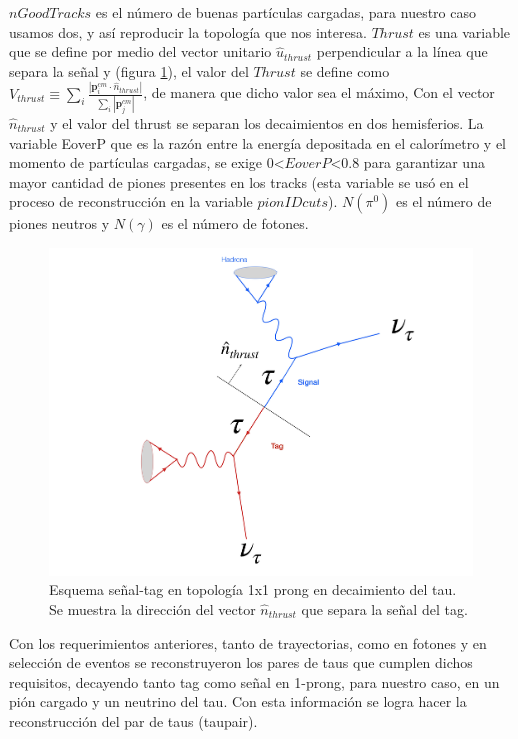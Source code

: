 \(nGoodTracks\) es el número de buenas partículas cargadas, para nuestro caso usamos dos, y así reproducir la topología que nos interesa. \(Thrust\) es una variable que se define por medio del vector unitario \(\hat{u}_{thrust}\) perpendicular a la línea que separa la señal y  (figura \ref{fig:MminTopo}), el valor del \(Thrust\) se define como \(V_{thrust}\equiv\sum_{i}\frac{|\mathbf{p}_i^{cm} \cdot \hat{n}_{thrust}|}{\sum_{i}|\mathbf{p}_{j}^{cm}|}\), de manera que dicho valor sea el máximo,  Con el vector \(\hat{n}_{thrust}\) y el valor del thrust se separan los decaimientos en dos hemisferios. La variable EoverP que es la razón entre la energía depositada en el calorímetro y el momento de partículas cargadas, se exige 0<\(EoverP\)<0.8 para garantizar una mayor cantidad de piones presentes en los tracks (esta variable se usó en el proceso de reconstrucción en la variable \(pionIDcuts\)). \(N(\pi^0)\) es el número de piones neutros y \(N(\gamma)\) es el número de fotones.
\begin{figure}[h]
    \centering
    \includegraphics[scale=.05]{Images/Diagram1x1.jpg}
    \caption{\small{Esquema señal-tag en topología 1x1 prong en decaimiento del tau. Se muestra la dirección del vector \(\hat{n}_{thrust}\) que separa la señal del tag.}}
    \label{fig:MminTopo}
\end{figure}

Con los requerimientos anteriores, tanto de trayectorias, como en fotones y en selección de eventos se reconstruyeron los pares de taus que cumplen dichos requisitos, decayendo tanto tag como señal en 1-prong, para nuestro caso, en un pión cargado y un neutrino del tau. Con esta información se logra hacer la reconstrucción del par de taus (taupair).

